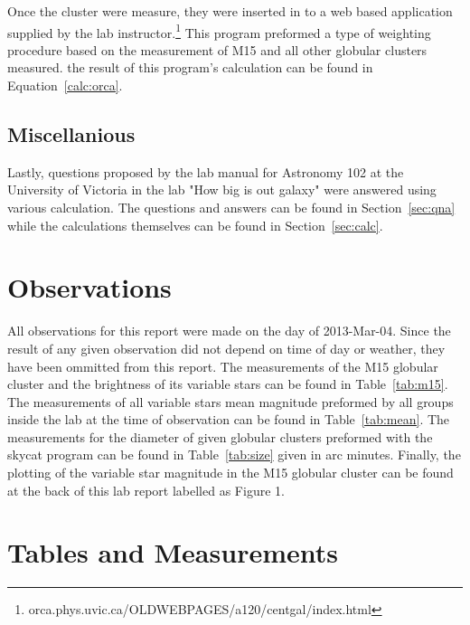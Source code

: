 \documentclass{article}
\begin{document}
Once the cluster were measure, they were inserted in to a web based application supplied
by the lab instructor.\footnote{orca.phys.uvic.ca/OLDWEBPAGES/a120/centgal/index.html}
This program preformed a type of weighting procedure based on the measurement of M15
and all other globular clusters measured. the result of this program's calculation
can be found in Equation~\ref{calc:orca}.

\subsection{Miscellanious}

Lastly, questions proposed by the lab manual for Astronomy 102 at the University of
Victoria in the lab "How big is out galaxy" were answered using various calculation.
The questions and answers can be found in Section~\ref{sec:qna} while the calculations
themselves can be found in Section~\ref{sec:calc}.


\section{Observations}

All observations for this report were made on the day of 2013-Mar-04. Since the result
of any given observation did not depend on time of day or weather, they have been ommitted
from this report. The measurements of the M15 globular cluster and the brightness of its
variable stars can be found in Table~\ref{tab:m15}. The measurements of all variable stars
mean magnitude preformed by all groups inside the lab at the time of observation can 
be found in Table~\ref{tab:mean}. The measurements for the diameter of given globular
clusters preformed with the skycat program can be found in Table~\ref{tab:size} given
in arc minutes. Finally, the plotting of the variable star magnitude in the M15 globular
cluster can be found at the back of this lab report labelled as Figure 1.


\section{Tables and Measurements}
\end{document}
